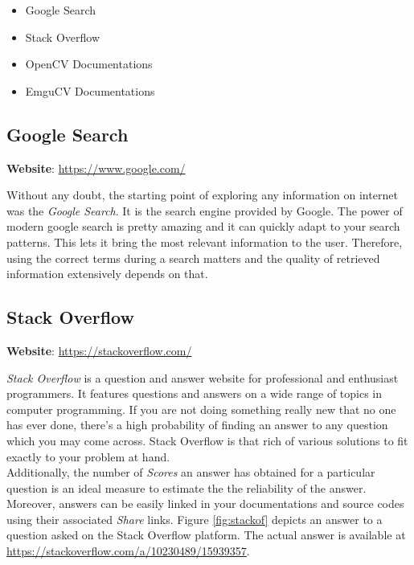 \documentclass[a4paper,12pt]{report}%
\begin{document}
\begin{itemize}
	\item Google Search 
	\item Stack Overflow 
	\item OpenCV Documentations 
	\item EmguCV Documentations 
\end{itemize}

\subsection{Google Search}

\textbf{Website}: \url{https://www.google.com/}

Without any doubt, the starting point of exploring any information on internet was the \textit{Google Search}.  It is the search engine provided by Google. The power of modern google search is pretty amazing and it can quickly adapt to your search patterns. This lets it bring the most relevant information to the user. Therefore, using the correct terms during a search matters and the quality of retrieved information extensively depends on that.

\subsection{Stack Overflow}

\textbf{Website}: \url{https://stackoverflow.com/}

\textit{Stack Overflow} is a question and answer website for professional and enthusiast programmers. It features questions and answers on a wide range of topics in computer programming\cite{stackoverflow}. If you are not doing something really new that no one has ever done, there's a high probability of finding an answer to any question which you may come across. Stack Overflow is that rich of various solutions to fit exactly to your problem at hand.\\

Additionally, the number of \textit{Scores} an answer has obtained for a particular question is an ideal measure to estimate the the reliability of the answer. Moreover, answers can be easily linked in your documentations and source codes using their associated \textit{Share} links. Figure \ref{fig:stackof} depicts an answer to a question asked on the Stack Overflow platform. The actual answer is available at \url{https://stackoverflow.com/a/10230489/15939357}.
\end{document}
